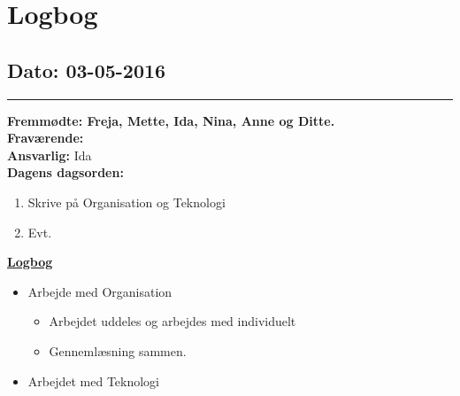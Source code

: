 \chapter{Logbog}
\section{Dato: 03-05-2016}
\hrule
\textbf{Fremmødte: Freja, Mette, Ida, Nina, Anne og Ditte.} \\
\textbf{Fraværende: } \\
\textbf{Ansvarlig: } Ida \\
\textbf{Dagens dagsorden: }
\begin{enumerate}
	\item Skrive på Organisation og Teknologi
	\item Evt. 
\end{enumerate}

\underline{\textbf{Logbog}}
\begin{itemize}
\item Arbejde med Organisation
\begin{itemize}
\item Arbejdet uddeles og arbejdes med individuelt
\item Gennemlæsning sammen.
\end{itemize}
\item Arbejdet med Teknologi
\end{itemize}
